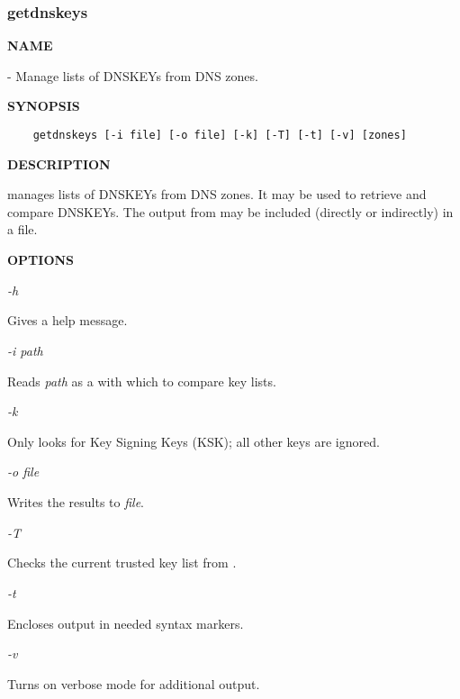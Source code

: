 \clearpage

\subsubsection{\bf getdnskeys}

{\bf NAME}

 - Manage lists of DNSKEYs from DNS zones.

{\bf SYNOPSIS}

\begin{verbatim}
    getdnskeys [-i file] [-o file] [-k] [-T] [-t] [-v] [zones]
\end{verbatim}

{\bf DESCRIPTION}

 manages lists of DNSKEYs from DNS zones.  It may be used to
retrieve and compare DNSKEYs.  The output from  may be
included (directly or indirectly) in a  file.

{\bf OPTIONS}

\begin{description}

\item {\it -h}\verb" "

Gives a help message.

\item {\it -i path}\verb" "

Reads {\it path} as a  with which to compare key lists.

\item {\it -k}\verb" "

Only looks for Key Signing Keys (KSK); all other keys are ignored.

\item {\it -o file}\verb" "

Writes the results to {\it file}.

\item {\it -T}\verb" "

Checks the current trusted key list from .

\item {\it -t}\verb" "

Encloses output in needed  syntax markers.

\item {\it -v}\verb" "

Turns on verbose mode for additional output.

\end{description}

